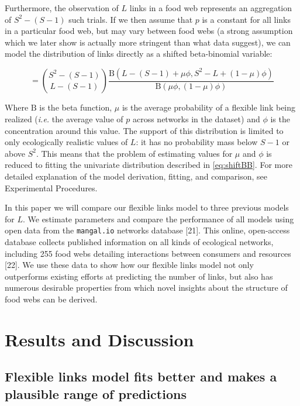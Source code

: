 \documentclass[12pt]{article}
\begin{document}
Furthermore, the observation of \(L\) links in a food web represents an
aggregation of \(S^2 - (S - 1)\) such trials. If we then assume that
\(p\) is a constant for all links in a particular food web, but may vary
between food webs (a strong assumption which we later show is actually
more stringent than what data suggest), we can model the distribution of
links directly as a shifted beta-binomial variable:

\begin{equation} [L|S,\mu, \phi] =  { S^2 - (S - 1) \choose L - (S - 1)} \frac{\mathrm{B}(L - (S - 1) + \mu \phi, S^2 - L + (1 - \mu)\phi)}{\mathrm{B}(\mu \phi, (1 - \mu)\phi)} \label{eq:shiftBB}\end{equation}

Where \(\mathrm{B}\) is the beta function, \(\mu\) is the average
probability of a flexible link being realized (\emph{i.e.} the average
value of \(p\) across networks in the dataset) and \(\phi\) is the
concentration around this value. The support of this distribution is
limited to only ecologically realistic values of \(L\): it has no
probability mass below \(S-1\) or above \(S^2\). This means that the
problem of estimating values for \(\mu\) and \(\phi\) is reduced to
fitting the univariate distribution described in \cref{eq:shiftBB}. For
more detailed explanation of the model derivation, fitting, and
comparison, see Experimental Procedures.

In this paper we will compare our flexible links model to three previous
models for \(L\). We estimate parameters and compare the performance of
all models using open data from the \texttt{mangal.io} networks database
{[}21{]}. This online, open-access database collects published
information on all kinds of ecological networks, including 255 food webs
detailing interactions between consumers and resources {[}22{]}. We use
these data to show how our flexible links model not only outperforms
existing efforts at predicting the number of links, but also has
numerous desirable properties from which novel insights about the
structure of food webs can be derived.

\hypertarget{results-and-discussion}{%
\section{Results and Discussion}\label{results-and-discussion}}

\hypertarget{flexible-links-model-fits-better-and-makes-a-plausible-range-of-predictions}{%
\subsection{Flexible links model fits better and makes a plausible range
of
predictions}\label{flexible-links-model-fits-better-and-makes-a-plausible-range-of-predictions}}
\end{document}

